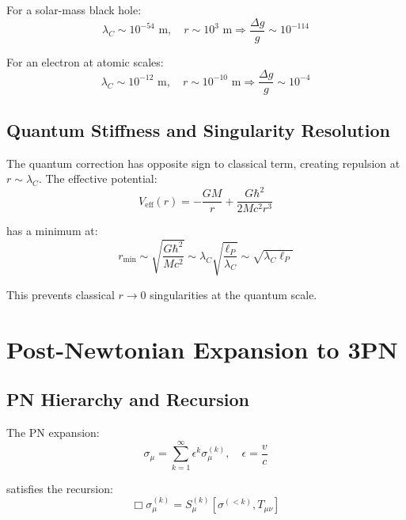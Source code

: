 \documentclass[11pt,a4paper]{article}
\theoremstyle{definition}
\theoremstyle{remark}
\begin{document}
	For a solar-mass black hole:
	\begin{equation}
		\lambda_C \sim 10^{-54}\text{ m}, \quad r \sim 10^3\text{ m} \Rightarrow \frac{\Delta g}{g} \sim 10^{-114}
	\end{equation}
	
	For an electron at atomic scales:
	\begin{equation}
		\lambda_C \sim 10^{-12}\text{ m}, \quad r \sim 10^{-10}\text{ m} \Rightarrow \frac{\Delta g}{g} \sim 10^{-4}
	\end{equation}
	
	\subsection{Quantum Stiffness and Singularity Resolution}
	
	The quantum correction has opposite sign to classical term, creating repulsion at $r \sim \lambda_C$. The effective potential:
	\begin{equation}
		V_{\text{eff}}(r) = -\frac{GM}{r} + \frac{G\hbar^2}{2Mc^2r^3}
	\end{equation}
	
	has a minimum at:
	\begin{equation}
		r_{\text{min}} \sim \sqrt{\frac{G\hbar^2}{Mc^2}} \sim \lambda_C\sqrt{\frac{\ell_P}{\lambda_C}} \sim \sqrt{\lambda_C\ell_P}
	\end{equation}
	
	This prevents classical $r \to 0$ singularities at the quantum scale.
	
	\section{Post-Newtonian Expansion to 3PN}
	
	\subsection{PN Hierarchy and Recursion}
	
	The PN expansion:
	\begin{equation}
		\sigma_\mu = \sum_{k=1}^\infty \epsilon^k\sigma_\mu^{(k)}, \quad \epsilon = \frac{v}{c}
	\end{equation}
	
	satisfies the recursion:
	\begin{equation}\label{eq:pn_recursion}
		\Box\sigma_\mu^{(k)} = S_\mu^{(k)}[\sigma^{(<k)}, T_{\mu\nu}]
	\end{equation}
	
\end{document}
